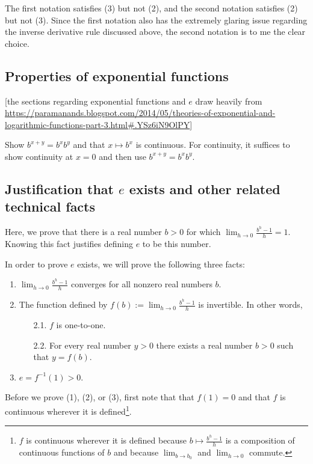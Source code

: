 The first notation satisfies (3) but not (2), and the second notation satisfies (2) but not (3). Since the first notation also has the extremely glaring issue regarding the inverse derivative rule discussed above, the second notation is to me the clear choice.

\subsection*{Properties of exponential functions}

[the sections regarding exponential functions and $e$ draw heavily from \url{https://paramanands.blogspot.com/2014/05/theories-of-exponential-and-logarithmic-functions-part-3.html#.YSz6iN9OlPY}]

Show $b^{x + y} = b^x b^y$ and that $x \mapsto b^x$ is continuous. For continuity, it suffices to show continuity at $x = 0$ and then use $b^{x + y} = b^x b^y$.

\subsection*{Justification that $e$ exists and other related technical facts}

Here, we prove that there is a real number $b > 0$ for which $\lim_{h \rightarrow 0} \frac{b^h - 1}{h} = 1$. Knowing this fact justifies defining $e$ to be this number.

In order to prove $e$ exists, we will prove the following three facts:

\begin{enumerate}
    \item $\lim_{h \rightarrow 0} \frac{b^h - 1}{h}$ converges for all nonzero real numbers $b$.
    \item The function defined by $f(b) := \lim_{h \rightarrow 0} \frac{b^h - 1}{h}$ is invertible. In other words, 
    \begin{enumerate}
        \item[2.1.] $f$ is one-to-one.
        \item[2.2.] For every real number $y > 0$ there exists a real number $b > 0$ such that $y = f(b)$.
    \end{enumerate}
    \item $e = f^{-1}(1) > 0$.
\end{enumerate}

Before we prove (1), (2), or (3), first note that that $f(1) = 0$ and that $f$ is continuous wherever it is defined\footnote{$f$ is continuous wherever it is defined because $b \mapsto \frac{b^h - 1}{h}$ is a composition of continuous functions of $b$ and because $\lim_{b \rightarrow b_0}$ and $\lim_{h \rightarrow 0}$ commute.}. 

